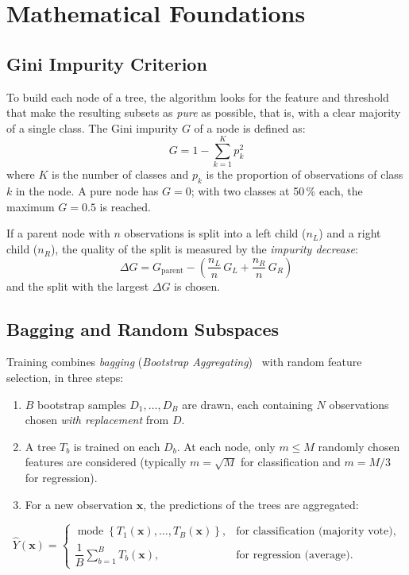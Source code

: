 \documentclass[12pt, a4paper]{article}
\begin{document}
\section{Mathematical Foundations}

\subsection{Gini Impurity Criterion}
To build each node of a tree, the algorithm looks for the feature and threshold that make the resulting subsets as \emph{pure} as possible, that is, with a clear majority of a single class. The Gini impurity $G$ of a node is defined as:
\begin{equation}
G = 1 - \sum_{k=1}^{K} p_k^2
\label{eq:gini}
\end{equation}
where $K$ is the number of classes and $p_k$ is the proportion of observations of class $k$ in the node. A pure node has $G=0$; with two classes at 50\,\% each, the maximum $G=0.5$ is reached.

If a parent node with $n$ observations is split into a left child ($n_L$) and a right child ($n_R$), the quality of the split is measured by the \emph{impurity decrease}:
\begin{equation}
\Delta G = G_{\text{parent}} - \left( \frac{n_L}{n}\, G_L + \frac{n_R}{n}\, G_R \right)
\label{eq:deltagini}
\end{equation}
and the split with the largest $\Delta G$ is chosen.

\subsection{Bagging and Random Subspaces}
Training combines \textit{bagging} (\textit{Bootstrap Aggregating})~\cite{amara2024} with random feature selection, in three steps:
\begin{enumerate}
    \item $B$ bootstrap samples $D_1,\dots,D_B$ are drawn, each containing $N$ observations chosen \emph{with replacement} from $D$.
    \item A tree $T_b$ is trained on each $D_b$. At each node, only $m \le M$ randomly chosen features are considered (typically $m = \sqrt{M}$ for classification and $m = M/3$ for regression).
    \item For a new observation $\mathbf{x}$, the predictions of the trees are aggregated:
\end{enumerate}
\begin{equation}
\hat{Y}(\mathbf{x}) =
\begin{cases}
\operatorname{mode}\left\{ T_1(\mathbf{x}), \dots, T_B(\mathbf{x}) \right\}, & \text{for classification (majority vote)},\\[6pt]
\dfrac{1}{B} \displaystyle\sum_{b=1}^{B} T_b(\mathbf{x}), & \text{for regression (average)}.
\end{cases}
\label{eq:aggregation}
\end{equation}
\end{document}

